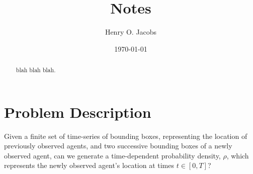 \documentclass[12pt]{amsart}
\title{Notes}
\author{Henry O. Jacobs}
\date{\today}
\begin{document}
\maketitle

\begin{abstract}
  blah blah blah.
\end{abstract}

\section{Problem Description}
Given a finite set of time-series of bounding boxes, representing the location of previously observed agents, and
two successive bounding boxes of a newly observed agent, can we generate a time-dependent probability density, $\rho$, which represents the
newly observed agent's location at times $t \in [0, T]$?
\end{document}
